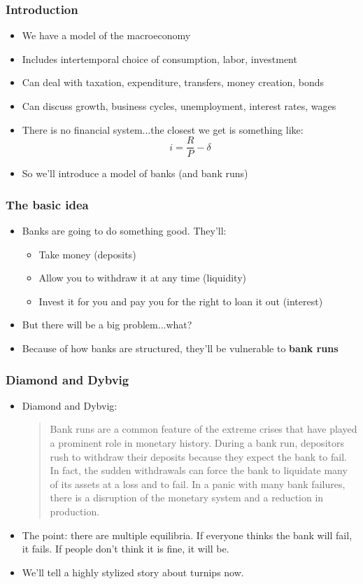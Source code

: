 \documentclass{beamer}
\author{Trevor Gallen}
\date{}
\begin{document}
\begin{frame}
\titlepage
\end{frame}

\begin{frame}
\frametitle{Introduction}
\begin{itemize}
\item<1-> We have a model of the macroeconomy
\bigskip
\item<2->  Includes intertemporal choice of consumption, labor, investment
\bigskip
\item<3->  Can deal with taxation, expenditure, transfers, money creation, bonds
\bigskip
\item<4->  Can discuss growth, business cycles, unemployment, interest rates, wages
\bigskip
\item<5->  There is no financial system...the closest we get is something like:
$$i=\frac{R}{P}-\delta$$
\item<6-> So we'll introduce a model of banks (and bank runs)
\end{itemize}
\end{frame}

\begin{frame}
\frametitle{The basic idea}
\begin{itemize}
\item<1-> Banks are going to do something good.  They'll:
\bigskip
\begin{itemize}
\item<2-> Take money (deposits)
\bigskip
\item<2-> Allow you to withdraw it at any time (liquidity)
\bigskip
\item<2-> Invest it for you and pay you for the right to loan it out (interest)
\bigskip
\end{itemize}
\item<3-> But there will be a big problem...what?
\bigskip
\item<4-> Because of how banks are structured, they'll be vulnerable to \textbf{bank runs}
\end{itemize}
\end{frame}

\begin{frame}
\frametitle{Diamond and Dybvig}
\begin{itemize}
\item<1-> Diamond and Dybvig:
\blockquote{Bank runs are a common feature of the extreme crises that have played a prominent role in monetary history. During a bank run, depositors rush to withdraw their deposits because they expect the bank to fail. In fact, the sudden withdrawals can force the bank to liquidate many of its assets at a loss and to fail. In a panic with many bank failures, there is a disruption of the monetary system and a reduction in production.}
\item<2-> The point: there are multiple equilibria.  If everyone thinks the bank will fail, it fails.  If people don't think it is fine, it will be.
\bigskip
\item<3-> We'll tell a highly stylized story about turnips now.  
\end{itemize}
\end{frame}
\end{document}
